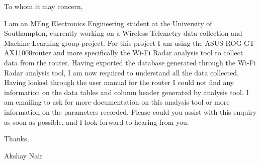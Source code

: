{To whom it may concern,

I am an MEng Electronics Engineering student at the University of Southampton, currently working on a Wireless Telemetry data collection and Machine Learning group project. For this project I am using the ASUS ROG GT-AX11000router and more specifically the Wi-Fi Radar analysis tool to collect data from the router. Having exported the database generated through the Wi-Fi Radar analysis tool, I am now required to understand all the data collected. Having looked through the user manual for the router I could not find any information on the data tables and column header generated by analysis tool. I am emailing to ask for more documentation on this analysis tool or more information on the parameters recorded. Please could you assist with this enquiry as soon as possible, and I look forward to hearing from you. 

Thanks,

Akshay Nair

}